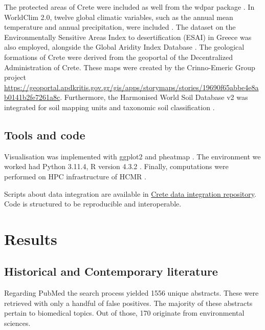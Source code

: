 The protected areas of Crete were included as well from the wdpar package \parencite{Hanson2022}.
In WorldClim 2.0, twelve global climatic variables, such as the annual mean
temperature and annual precipitation, were included \parencite{Fick2017}.
The dataset on the Environmentally Sensitive Areas Index to desertification (ESAI)
in Greece \parencite{KARAMESOUTI2018266} was also employed, alongside the
Global Aridity Index Database \parencite{zomer2022version}.
The geological formations of Crete were derived from the geoportal of the
Decentralized Administration of Crete. These maps were created by the Crinno-Emeric Group
project \url{https://geoportal.apdkritis.gov.gr/gis/apps/storymaps/stories/19690f65abbe4e8ab0141b2fe7261a8c}.
Furthermore, the Harmonised World Soil Database v2 was integrated for soil mapping units and taxonomic soil classification \parencite{fao2023}.

\subsection{Tools and code}\label{Coding environment}
Visualisation was implemented with ggplot2 \parencite{wickham_ggplot2_2016} and pheatmap \parencite{Kolde2019}.
The environment we worked had Python 3.11.4, R version 4.3.2 \parencite{rcoreteam}.
Finally, computations were performed on HPC infrastructure of HCMR \parencite{zafeiropoulos_0s_2021}.

Scripts about data integration are available in
\href{https://github.com/savvas-paragkamian/crete-data-integration}{Crete data integration repository}.
Code is structured to be reproducible and interoperable.

\section{Results}\label{crete_idea_results}

\subsection{Historical and Contemporary literature}

Regarding PubMed the search process yielded 1556 unique abstracts. These were retrieved with only a handful of false positives.
The majority of these abstracts pertain to biomedical topics. Out of those, 170 originate from environmental sciences.

